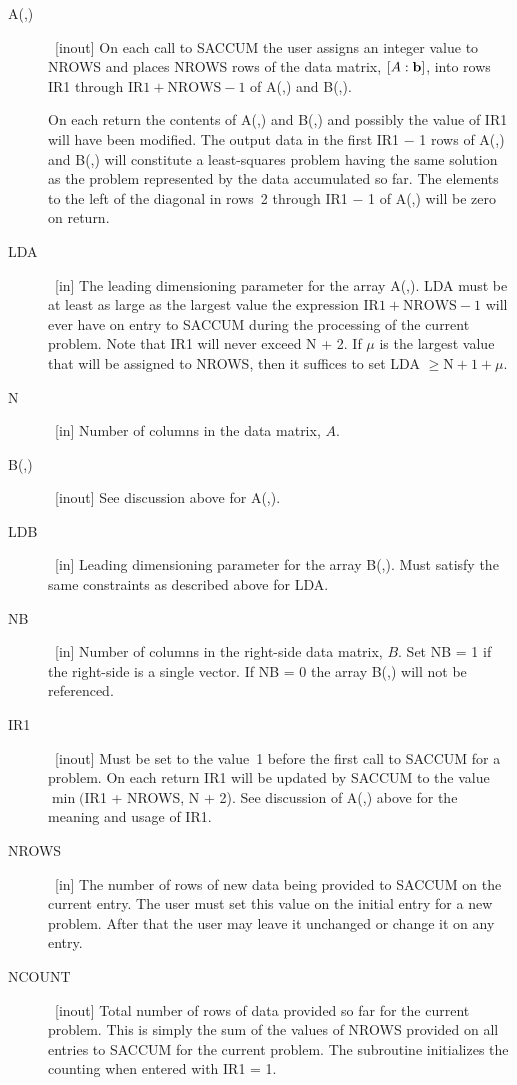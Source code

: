 \documentclass[twoside]{MATH77}
\begin{document}
\begin{description}
\item[A(,)] \ [inout] On each call to SACCUM the user assigns an integer
value to NROWS and places NROWS rows of the data matrix, $[A:{\bf b}]$, into
rows IR1 through $\text{IR1}+\text{NROWS}-1$ of A(,) and B(,).

On each return the contents of A(,) and B(,) and possibly the value of IR1
will have been modified. The output data in the first IR1 $-$ 1 rows of A(,)
and B(,) will constitute a least-squares problem having the same solution as
the problem represented by the data accumulated so far. The elements to the
left of the diagonal in rows~2 through IR1 $-$ 1 of A(,) will be zero on
return.

\item[LDA] \ [in] The leading dimensioning parameter for the array A(,). LDA
must be at least as large as the largest value the expression $\text{IR1}+
\text{NROWS}-1$ will ever have on entry to SACCUM during the processing of the
current problem. Note that IR1 will never exceed N + 2. If $\mu $ is the
largest value that will be assigned to NROWS, then it suffices to set LDA $%
\geq \text{N}+1+\mu .$

\item[N] \ [in] Number of columns in the data matrix, $A$.

\item[B(,)] \ [inout] See discussion above for A(,).

\item[LDB] \ [in] Leading dimensioning parameter for the array B(,). Must
satisfy the same constraints as described above for LDA.

\item[NB] \ [in] Number of columns in the right-side data matrix, $B$. Set NB =
1 if the right-side is a single vector. If NB = 0 the array B(,) will not be
referenced.

\item[IR1] \ [inout] Must be set to the value~1 before the first call to
SACCUM for a problem. On each return IR1 will be updated by SACCUM to the
value $\min ($IR1 + NROWS, N + 2). See discussion of A(,) above for the
meaning and usage of IR1.

\item[NROWS] \ [in] The number of rows of new data being provided to SACCUM
on the current entry. The user must set this value on the initial entry for
a new problem. After that the user may leave it unchanged or change it on
any entry.

\item[NCOUNT] \ [inout] Total number of rows of data provided so far for
the current problem.  This is simply the sum of the values of NROWS
provided on all entries to SACCUM for the current problem.  The subroutine
initializes the counting when entered with IR1 = 1.
\end{description}
\end{document}

